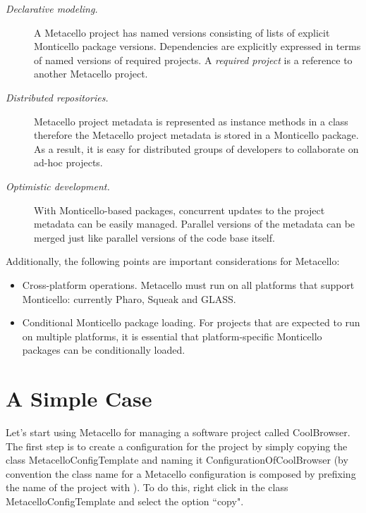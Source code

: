 \documentclass[a4paper,10pt,twoside]{book}
\begin{document}
\begin{description}
\item[\textit{Declarative modeling.}] A Metacello project has named versions consisting of lists of explicit Monticello package versions. Dependencies are explicitly expressed in terms of named versions of required projects. A \emph{required project} is a reference to another Metacello project.

\item[\textit{ Distributed repositories.}] Metacello project metadata is represented as instance methods in a class therefore the Metacello project metadata is stored in a Monticello package. As a result, it is easy for distributed groups of developers to collaborate on ad-hoc projects.

\item[\textit{ Optimistic development.}] With Monticello-based packages, concurrent updates to the project metadata can be easily managed. Parallel versions of the metadata can be merged just like parallel versions of the code base itself. 

\end{description}

Additionally, the following points are important considerations for Metacello:

\begin{itemize}
\item Cross-platform operations. Metacello must run on all platforms that support Monticello: currently Pharo, Squeak and GLASS.
\item Conditional Monticello package loading. For projects that are expected to run on multiple platforms, it is essential that platform-specific Monticello packages can be conditionally loaded. 
\end{itemize}

\section{A Simple Case}

Let's start using Metacello for managing a software project called CoolBrowser. The first step is to create a configuration for the project by simply copying the class MetacelloConfigTemplate and naming it ConfigurationOfCoolBrowser (by convention the class name for a Metacello configuration is composed by prefixing the name of the project with ). To do this, right click in the class MetacelloConfigTemplate and select the option ``copy". 
\end{document}

